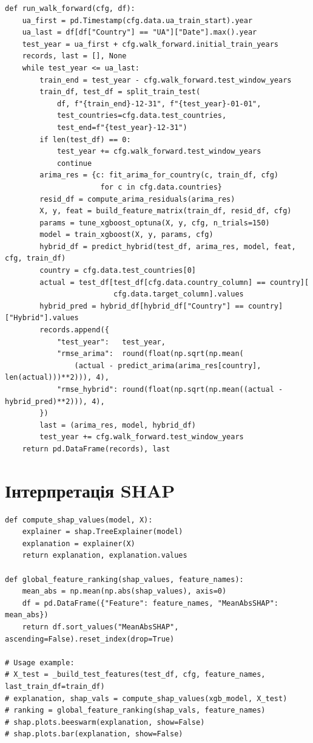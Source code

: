 \documentclass{bachelor_thesis}
\begin{document}
\begin{lstlisting}[caption={Розширюване вікно оцінювання та формування гібридного прогнозу}]
def run_walk_forward(cfg, df):
    ua_first = pd.Timestamp(cfg.data.ua_train_start).year
    ua_last = df[df["Country"] == "UA"]["Date"].max().year
    test_year = ua_first + cfg.walk_forward.initial_train_years
    records, last = [], None
    while test_year <= ua_last:
        train_end = test_year - cfg.walk_forward.test_window_years
        train_df, test_df = split_train_test(
            df, f"{train_end}-12-31", f"{test_year}-01-01",
            test_countries=cfg.data.test_countries,
            test_end=f"{test_year}-12-31")
        if len(test_df) == 0:
            test_year += cfg.walk_forward.test_window_years
            continue
        arima_res = {c: fit_arima_for_country(c, train_df, cfg)
                      for c in cfg.data.countries}
        resid_df = compute_arima_residuals(arima_res)
        X, y, feat = build_feature_matrix(train_df, resid_df, cfg)
        params = tune_xgboost_optuna(X, y, cfg, n_trials=150)
        model = train_xgboost(X, y, params, cfg)
        hybrid_df = predict_hybrid(test_df, arima_res, model, feat, cfg, train_df)
        country = cfg.data.test_countries[0]
        actual = test_df[test_df[cfg.data.country_column] == country][
                         cfg.data.target_column].values
        hybrid_pred = hybrid_df[hybrid_df["Country"] == country]["Hybrid"].values
        records.append({
            "test_year":   test_year,
            "rmse_arima":  round(float(np.sqrt(np.mean(
                (actual - predict_arima(arima_res[country], len(actual)))**2))), 4),
            "rmse_hybrid": round(float(np.sqrt(np.mean((actual - hybrid_pred)**2))), 4),
        })
        last = (arima_res, model, hybrid_df)
        test_year += cfg.walk_forward.test_window_years
    return pd.DataFrame(records), last
\end{lstlisting}

\section{Інтерпретація SHAP}
\label{sec:appendix_shap}

\begin{lstlisting}[caption={Обчислення та глобальне ранжування значень SHAP}]
def compute_shap_values(model, X):
    explainer = shap.TreeExplainer(model)
    explanation = explainer(X)
    return explanation, explanation.values

def global_feature_ranking(shap_values, feature_names):
    mean_abs = np.mean(np.abs(shap_values), axis=0)
    df = pd.DataFrame({"Feature": feature_names, "MeanAbsSHAP": mean_abs})
    return df.sort_values("MeanAbsSHAP", ascending=False).reset_index(drop=True)

# Usage example:
# X_test = _build_test_features(test_df, cfg, feature_names, last_train_df=train_df)
# explanation, shap_vals = compute_shap_values(xgb_model, X_test)
# ranking = global_feature_ranking(shap_vals, feature_names)
# shap.plots.beeswarm(explanation, show=False)
# shap.plots.bar(explanation, show=False)
\end{lstlisting}
\end{document}

